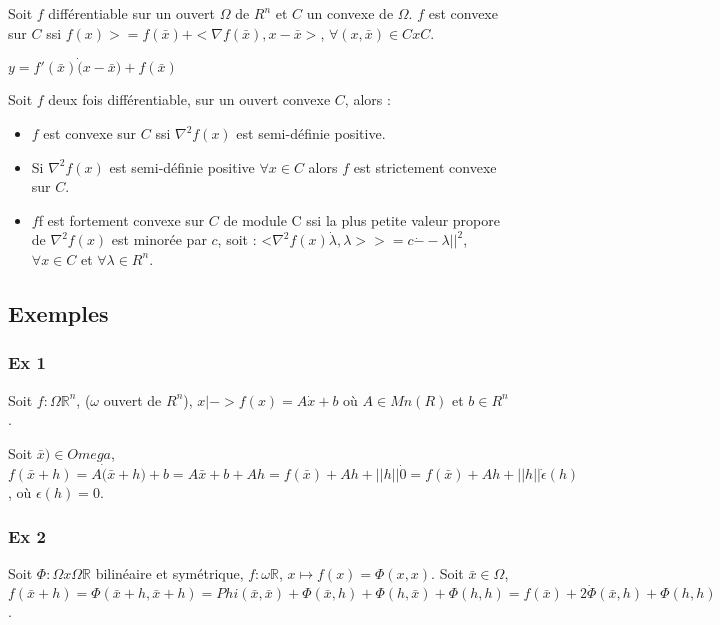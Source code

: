 		Soit $f$ différentiable sur un ouvert $\Omega$ de $R^n$ et $C$ un convexe de $\Omega$.
		$f$ est convexe sur $C$ ssi $f(x) >= f(\bar{x}) + <\nabla f(\bar{x}), x-\bar{x}>$, $\forall (x, \bar{x}) \in C x C$.
		
		$y=f'(\bar{x}) \dot (x-\bar{x}) +f(\bar{x})$
		
		Soit $f$ deux fois différentiable, sur un ouvert convexe $C$, alors :
		\begin{itemize}
			\item $f$ est convexe sur $C$ ssi $\nabla^2 f(x)$ est semi-définie positive.
			\item Si $\nabla^2 f(x)$ est semi-définie positive $\forall x \in C$ alors $f$ est strictement convexe sur $C$.
			\item $f$f est fortement convexe sur $C$ de module C ssi la plus petite valeur propore de $\nabla^2 f(x)$ est minorée par $c$, soit : <$\nabla^2 f(x) \dot \lambda, \lambda> >= c \dot --\lambda ||^2$, $\forall x \in C$ et $\forall \lambda \in R^n$.
		\end{itemize}
		
		
	\subsection{Exemples}
	
		\subsubsection{Ex 1}
		
		Soit $f:\Omega \mathbb{R}^n$, ($\omega$ ouvert de $R^n$), $x|-> f(x) = A \dot x +b$ où $A \in Mn(R)$ et $b \in R^n$.
		
		Soit $\bar{x}) \in Omega$, $f(\bar{x} +h) = A \dot (\bar{x}+h) + b = A \bar{x} + b + Ah = f(\bar{x}) + Ah + ||h|| \dot 0 = f(\bar{x}) + Ah + ||h|| \dot \epsilon (h)$, où $\epsilon (h) = 0$.
		
		
		
		\subsubsection{Ex 2}
		
		Soit $\Phi : \Omega x \Omega \mathbb{R}$ bilinéaire et symétrique, $f: \omega \mathbb{R}$, $x \mapsto f(x) = \Phi(x, x)$.
		Soit $\bar{x} \in \Omega$, $f(\bar{x}+h) = \Phi(\bar{x}+h, \bar{x}+h) = Phi(\bar{x}, \bar{x}) + \Phi(\bar{x}, h) + \Phi(h, \bar{x}) + \Phi(h, h) = f(\bar{x}) + 2 \dot \Phi(\bar{x}, h) + \Phi(h, h)$.
		

